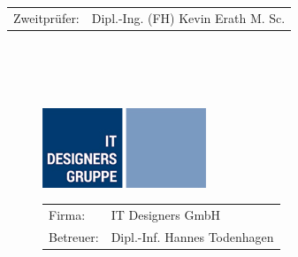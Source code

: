 \begin{titlepage}
\begin{tabular}{rl}
		Zweitprüfer: & Dipl.-Ing. (FH) Kevin Erath M. Sc.\\
	\end{tabular}
	~\\ ~\\ ~\\	
	\begin{figure}[H]
		\begin{minipage}{0.4\textwidth}
			\begin{center}
				\includegraphics[width=.8\textwidth]{images/itd_logo}
			\end{center}
		\end{minipage}%
		\begin{minipage}{0.7\textwidth}
			\begin{tabular}{ll}
				Firma: & IT Designers GmbH\\
				Betreuer: & Dipl.-Inf. Hannes Todenhagen
			\end{tabular}
		\end{minipage}
	\end{figure}
\end{titlepage}






